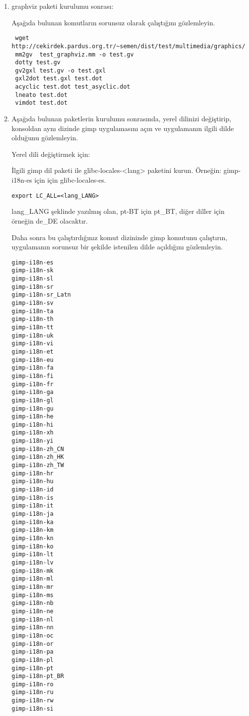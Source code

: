 \documentclass[a4paper,10pt]{article}
\begin{document}
\begin{enumerate}
Aşağıda bulunan komutları çalıştırın ve uygulamanın karakterleri taryabildiğini ve test adında bir dosyaya yazabildiğini gözlemleyin.
\begin{verbatim}
 wget http://cekirdek.pardus.org.tr/~semen/dist/test/multimedia/graphics/font1.pbm.gz
 gocr -i font1.pbm.gz -o test
 vi test
\end{verbatim}

\item graphviz paketi kurulumu sonrası:

Aşağıda bulunan komutların sorunsuz olarak çalıştığını gözlemleyin.
\begin{verbatim}
 wget http://cekirdek.pardus.org.tr/~semen/dist/test/multimedia/graphics/test_graphviz.mm
 mm2gv  test_graphviz.mm -o test.gv
 dotty test.gv
 gv2gxl test.gv -o test.gxl
 gxl2dot test.gxl test.dot
 acyclic test.dot test_asyclic.dot
 lneato test.dot
 vimdot test.dot
\end{verbatim}

 \item Aşağıda bulunan paketlerin kurulumu sonrasında, yerel dilinizi değiştirip, konsoldan aynı dizinde gimp uygulamasını açın ve uygulamanın ilgili dilde olduğunu gözlemleyin.

Yerel dili değiştirmek için:

İlgili gimp dil paketi ile glibc-locales-<lang> paketini kurun. Örneğin: gimp-i18n-es için için glibc-locales-es.

\begin{verbatim}
export LC_ALL=<lang_LANG>
\end{verbatim}

lang\_LANG şeklinde yazılmış olan, pt-BT için pt\_BT, diğer diller için örneğin de\_DE olacaktır.

Daha sonra bu çalıştırdığınız komut dizininde gimp komutunu çalıştırın, uygulamanın sorunsuz bir şekilde istenilen dilde açıldığını gözlemleyin.
\begin{verbatim}
gimp-i18n-es
gimp-i18n-sk
gimp-i18n-sl
gimp-i18n-sr
gimp-i18n-sr_Latn
gimp-i18n-sv
gimp-i18n-ta
gimp-i18n-th
gimp-i18n-tt
gimp-i18n-uk
gimp-i18n-vi
gimp-i18n-et
gimp-i18n-eu
gimp-i18n-fa
gimp-i18n-fi
gimp-i18n-fr
gimp-i18n-ga
gimp-i18n-gl
gimp-i18n-gu
gimp-i18n-he
gimp-i18n-hi
gimp-i18n-xh
gimp-i18n-yi
gimp-i18n-zh_CN
gimp-i18n-zh_HK
gimp-i18n-zh_TW
gimp-i18n-hr
gimp-i18n-hu
gimp-i18n-id
gimp-i18n-is
gimp-i18n-it
gimp-i18n-ja
gimp-i18n-ka
gimp-i18n-km
gimp-i18n-kn
gimp-i18n-ko
gimp-i18n-lt
gimp-i18n-lv
gimp-i18n-mk
gimp-i18n-ml
gimp-i18n-mr
gimp-i18n-ms
gimp-i18n-nb
gimp-i18n-ne
gimp-i18n-nl
gimp-i18n-nn
gimp-i18n-oc
gimp-i18n-or
gimp-i18n-pa
gimp-i18n-pl
gimp-i18n-pt
gimp-i18n-pt_BR
gimp-i18n-ro
gimp-i18n-ru
gimp-i18n-rw
gimp-i18n-si 
\end{verbatim}


\end{enumerate}
\end{document}
